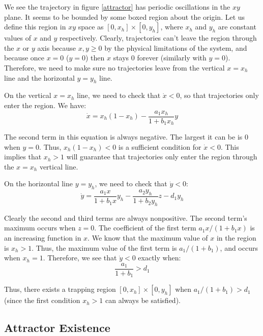 \documentclass[%
        final,
        notitlepage,
        narroweqnarray,
        inline,
        ]{ieee}
\begin{document}
We see the trajectory in figure \ref{attractor} has periodic oscillations in the $xy$ plane. It seems to be bounded by some boxed region about the origin. Let us define this region in $xy$ space as $[0,x_h] \times [0, y_h]$, where $x_h$ and $y_h$ are constant values of $x$ and $y$ respectively. Clearly, trajectories can't leave the region through the $x$ or $y$ axis because $x,y \geq 0$ by the physical limitations of the system, and because once $x=0$ ($y = 0$) then $x$ stays 0 forever (similarly with $y = 0$). Therefore, we need to make sure no trajectories leave from the vertical $x = x_h$ line and the horizontal $y = y_h$ line. 

On the vertical $x = x_h$ line, we need to check that $\dot{x} < 0$, so that trajectories only enter the region. We have:
\begin{equation}
\dot{x} = x_h(1 - x_h) - \frac{a_1 x_h}{1 + b_1 x_h} y
\end{equation}

The second term in this equation is always negative. The largest it can be is $0$ when $y = 0$. Thus, $x_h ( 1 - x_h) < 0$ is a sufficient condition for $\dot{x} < 0$. This implies that $x_h > 1$ will guarantee that trajectories only enter the region through the $x = x_h$ vertical line. 

On the horizontal line $y = y_h$, we need to check that $\dot{y} < 0$:
\begin{equation}
\dot{y} = \frac{a_1 x}{1 + b_1 x} y_h - \frac{a_2 y_h}{1 + b_2 y_h} z - d_1 y_h
\end{equation}

Clearly the second and third terms are always nonpositive. The second term's maximum occurs when $z = 0$. The coefficient of the first term $a_1 x / (1 + b_1 x)$ is an increasing function in $x$. We know that the maximum value of $x$ in the region is $x_h > 1$. Thus, the maximum value of the first term is $a_1 / (1 + b_1)$, and occurs when $x_h = 1$. Therefore, we see that $\dot{y} < 0$ exactly when:
\begin{equation}
\frac{a_1}{1 + b_1} > d_1
\end{equation}

Thus, there exists a trapping region $[0,x_h] \times [0, y_h]$ when $a_1 / (1 + b_1) > d_1$ (since the first condition $x_h > 1$ can always be satisfied). 

\subsection{Attractor Existence}
\label{sec:attractorexist}
\end{document}

